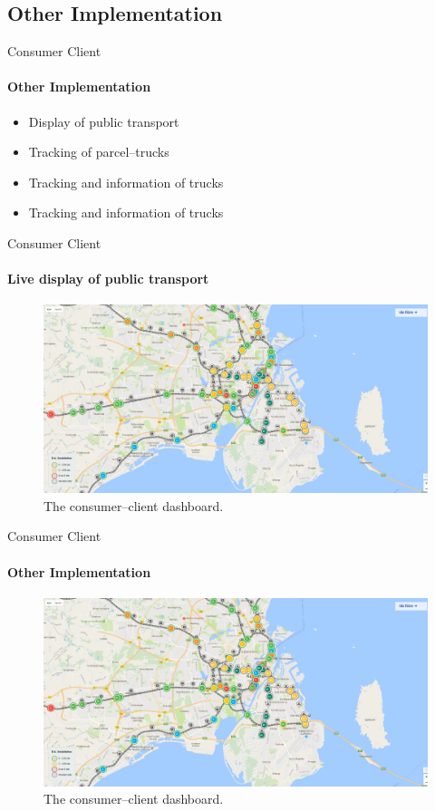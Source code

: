 \subsection{Other Implementation}

\begin{frame}{Consumer Client}
    \framesubtitle{Other Implementation}

    \begin{itemize}
        \item Display of public transport
        \item Tracking of parcel--trucks
        \item Tracking and information of trucks
        \item Tracking and information of trucks
    \end{itemize}
\end{frame}

\begin{frame}{Consumer Client}
    \framesubtitle{Live display of public transport}

    \begin{figure}[h]
        \centering
        \includegraphics[scale=0.2]{images/RejseplanenLivemap.png}
        \caption{The consumer--client dashboard.}
    \end{figure}
\end{frame}

\begin{frame}{Consumer Client}
    \framesubtitle{Other Implementation}

    \begin{figure}[h]
        \centering
        \includegraphics[scale=0.2]{images/RejseplanenLivemap.png}
        \caption{The consumer--client dashboard.}
    \end{figure}
\end{frame}

